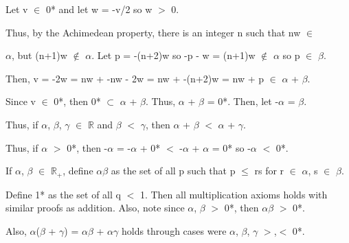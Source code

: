 \begin{adjustbox}{minipage=14cm, right, vspace=0.1cm 0cm}
			\qquad Let v $\in$ 0* and let w = -v/2 so w $>$ 0.

			\qquad Thus, by the Achimedean property, there is an integer n such that
			nw $\in$

			\qquad $\alpha$, but (n+1)w $\not \in$ $\alpha$.
			Let p = -(n+2)w so -p - w = (n+1)w $\not \in$ $\alpha$ so p $\in$ $\beta$.

			\qquad Then, v = -2w = nw + -nw - 2w = nw + -(n+2)w = nw + p $\in$ $\alpha$ + $\beta$.

			\qquad Since v $\in$ 0*, then 0* $\subset$ $\alpha$ + $\beta$.
			Thus, $\alpha$ + $\beta$ = 0*. Then, let -$\alpha$ = $\beta$.

		Thus, if $\alpha$, $\beta$, $\gamma$ $\in$ $\mathbb{R}$ and $\beta$ $<$ $\gamma$, then
		$\alpha$ + $\beta$ $<$ $\alpha$ + $\gamma$.

		Thus, if $\alpha$ $>$ 0*, then -$\alpha$ = -$\alpha$ + 0* $<$ -$\alpha$ + $\alpha$ = 0*
		so -$\alpha$ $<$ 0*.

		If $\alpha$, $\beta$ $\in$ $\mathbb{R}_+$, define $\alpha$$\beta$ as the set of all p
		such that p $\leq$ rs for r $\in$ $\alpha$, s $\in$ $\beta$.

		Define 1* as the set of all q $<$ 1.
		Then all multiplication axioms holds with similar proofs as addition.
		Also, note since $\alpha$, $\beta$ $>$ 0*, then $\alpha$$\beta$ $>$ 0*.

		Also, $\alpha$($\beta$ + $\gamma$) = $\alpha$$\beta$ + $\alpha$$\gamma$ holds
		through cases were $\alpha$, $\beta$, $\gamma$ $>$,$<$ 0*.
	\end{adjustbox}




	